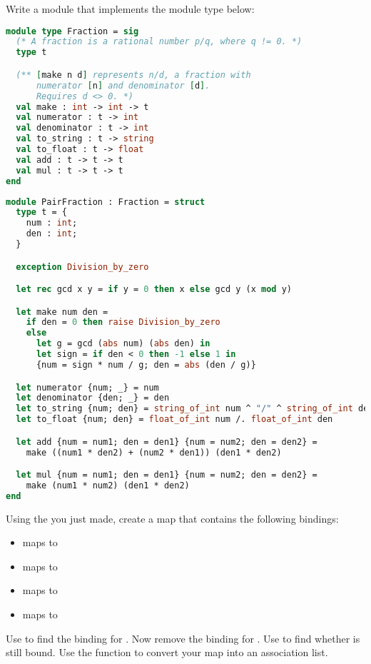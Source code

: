\problem[fraction]
Write a module that implements the  module type below:
\begin{lstlisting}[language=OCaml]
module type Fraction = sig
  (* A fraction is a rational number p/q, where q != 0. *)
  type t

  (** [make n d] represents n/d, a fraction with
      numerator [n] and denominator [d].
      Requires d <> 0. *)
  val make : int -> int -> t
  val numerator : t -> int
  val denominator : t -> int
  val to_string : t -> string
  val to_float : t -> float
  val add : t -> t -> t
  val mul : t -> t -> t
end
\end{lstlisting}

\begin{lstlisting}[language=OCaml]
module PairFraction : Fraction = struct
  type t = {
    num : int;
    den : int;
  }

  exception Division_by_zero

  let rec gcd x y = if y = 0 then x else gcd y (x mod y)

  let make num den =
    if den = 0 then raise Division_by_zero
    else
      let g = gcd (abs num) (abs den) in
      let sign = if den < 0 then -1 else 1 in
      {num = sign * num / g; den = abs (den / g)}

  let numerator {num; _} = num
  let denominator {den; _} = den
  let to_string {num; den} = string_of_int num ^ "/" ^ string_of_int den
  let to_float {num; den} = float_of_int num /. float_of_int den

  let add {num = num1; den = den1} {num = num2; den = den2} =
    make ((num1 * den2) + (num2 * den1)) (den1 * den2)

  let mul {num = num1; den = den1} {num = num2; den = den2} =
    make (num1 * num2) (den1 * den2)
end
\end{lstlisting}

Using the  you just made, create a map that contains the following bindings:
\begin{itemize}
  \item {} maps to 
  \item {} maps to 
  \item {} maps to 
  \item {} maps to 
\end{itemize}
Use  to find the binding for .
Now remove the binding for . Use  to find whether  is still bound.
Use the function  to convert your map into an association list.

